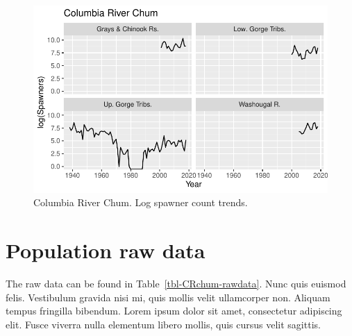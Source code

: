 \documentclass[
  letterpaper,
  oneside,
  open=any]{scrbook}
\begin{document}
\begin{figure}

{\centering \includegraphics{text/Chapter1_files/figure-pdf/fig-CRchum-status-1.pdf}

}

\caption{\label{fig-CRchum-status}Columbia River Chum. Log spawner count
trends.}

\end{figure}

\hypertarget{population-raw-data}{%
\section{Population raw data}\label{population-raw-data}}

The raw data can be found in Table~\ref{tbl-CRchum-rawdata}. Nunc quis
euismod felis. Vestibulum gravida nisi mi, quis mollis velit ullamcorper
non. Aliquam tempus fringilla bibendum. Lorem ipsum dolor sit amet,
consectetur adipiscing elit. Fusce viverra nulla elementum libero
mollis, quis cursus velit sagittis.
\end{document}

